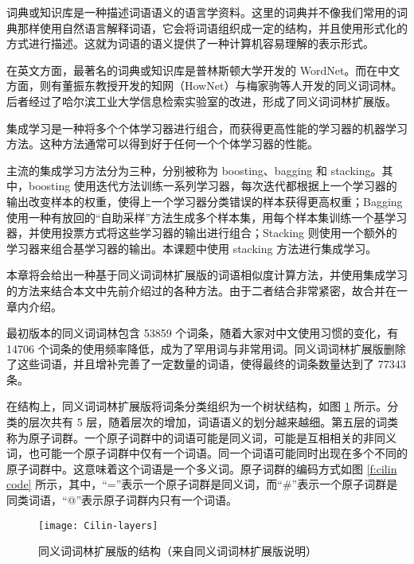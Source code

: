 
\label{c:ensemble}
词典或知识库是一种描述词语语义的语言学资料。这里的词典并不像我们常用的词典那样使用自然语言解释词语，它会将词语组织成一定的结构，并且使用形式化的方式进行描述。这就为词语的语义提供了一种计算机容易理解的表示形式。

在英文方面，最著名的词典或知识库是普林斯顿大学开发的 WordNet。而在中文方面，则有董振东教授开发的知网（HowNet）与梅家驹等人开发的同义词词林。后者经过了哈尔滨工业大学信息检索实验室的改进，形成了同义词词林扩展版。

集成学习是一种将多个个体学习器进行组合，而获得更高性能的学习器的机器学习方法。这种方法通常可以得到好于任何一个个体学习器的性能。

主流的集成学习方法分为三种，分别被称为 boosting、bagging 和 stacking。其中，boosting 使用迭代方法训练一系列学习器，每次迭代都根据上一个学习器的输出改变样本的权重，使得上一个学习器分类错误的样本获得更高权重；Bagging 使用一种有放回的“自助采样”方法生成多个样本集，用每个样本集训练一个基学习器，并使用投票方式将这些学习器的输出进行组合；Stacking 则使用一个额外的学习器来组合基学习器的输出。本课题中使用 stacking 方法进行集成学习。

本章将会给出一种基于同义词词林扩展版的词语相似度计算方法，并使用集成学习的方法来结合本文中先前介绍过的各种方法。由于二者结合非常紧密，故合并在一章内介绍。

最初版本的同义词词林包含 53859 个词条，随着大家对中文使用习惯的变化，有 14706 个词条的使用频率降低，成为了罕用词与非常用词。同义词词林扩展版删除了这些词语，并且增补完善了一定数量的词语，使得最终的词条数量达到了 77343 条。

在结构上，同义词词林扩展版将词条分类组织为一个树状结构，如图 \ref{f:cilin layers} 所示。分类的层次共有 5 层，随着层次的增加，词语语义的划分越来越细。第五层的词类称为原子词群。一个原子词群中的词语可能是同义词，可能是互相相关的非同义词，也可能一个原子词群中仅有一个词语。同一个词语可能同时出现在多个不同的原子词群中。这意味着这个词语是一个多义词。原子词群的编码方式如图 \ref{f:cilin code} 所示，其中，“=”表示一个原子词群是同义词，而“\#”表示一个原子词群是同类词语，“@”表示原子词群内只有一个词语。

\begin{figure}[h]
	\centering
	\texttt{[image: Cilin-layers]}
	\caption{同义词词林扩展版的结构（来自同义词词林扩展版说明）}
	\label{f:cilin layers}
	\vspace{-1em}
\end{figure}

